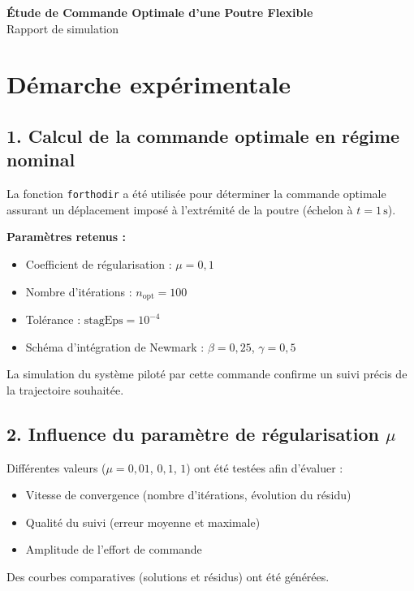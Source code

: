\documentclass[12pt,a4paper]{article}
\begin{document}
\begin{center}
\Large\textbf{Étude de Commande Optimale d'une Poutre Flexible}\\
\vspace{0.5em}
\normalsize Rapport de simulation
\end{center}

\section*{Démarche expérimentale}

\subsection{1. Calcul de la commande optimale en régime nominal}
La fonction \texttt{forthodir} a été utilisée pour déterminer la commande optimale assurant un déplacement imposé à l'extrémité de la poutre (échelon à \( t = 1 \, \text{s} \)).

\textbf{Paramètres retenus :}
\begin{itemize}[noitemsep]
    \item Coefficient de régularisation : \( \mu = 0,1 \)
    \item Nombre d'itérations : \( n_{\text{opt}} = 100 \)
    \item Tolérance : \( \text{stagEps} = 10^{-4} \)
    \item Schéma d'intégration de Newmark : \( \beta = 0,25 \), \( \gamma = 0,5 \)
\end{itemize}

La simulation du système piloté par cette commande confirme un suivi précis de la trajectoire souhaitée.

\subsection{2. Influence du paramètre de régularisation \( \mu \)}
Différentes valeurs (\( \mu = 0,01 \), \( 0,1 \), \( 1 \)) ont été testées afin d'évaluer :
\begin{itemize}[noitemsep]
    \item Vitesse de convergence (nombre d'itérations, évolution du résidu)
    \item Qualité du suivi (erreur moyenne et maximale)
    \item Amplitude de l'effort de commande
\end{itemize}
Des courbes comparatives (solutions et résidus) ont été générées.
\end{document}
